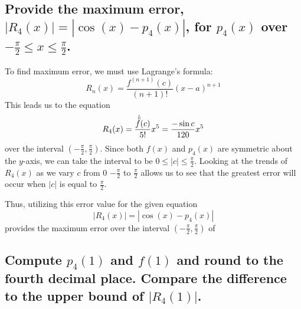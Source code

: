 \documentclass[12pt, letterpaper]{article}
\begin{document}
\subsection{Provide the maximum error, $|R_{4}{(x)}|=|\cos{(x)}-p_{4}{(x)}|$,
for $p_{4}{(x)}$ over $-\frac{\pi}{2}\leq x \leq \frac{\pi}{2}$.}
To find maximum error, we must use Lagrange's formula:
\begin{equation}
	R_{n}{(x)} = \frac{f^{(n+1)}{(c)}}{(n+1)!}{(x-a)}^{n+1}
\end{equation}
This leads us to the equation
\begin{equation}
	R_{4}{(x)}=\frac{\Dot{\Ddot{\Ddot{f}}}{(c)}}{5!}{x^{5}}=\frac{-\sin{c}}{120}x^{5}
\end{equation}
over the interval ${(-\frac{\pi}{2}, \frac{\pi}{2})}$.
Since both $f{(x)}$ and $p_4{(x)}$ are symmetric about the $y$-axis, we can
take the interval to be $0 \leq |c| \leq \frac{\pi}{2}$.
Looking at the trends of $R_4{(x)}$ as we vary $c$ from 0 $-\frac{\pi}{2}$ to
$\frac{\pi}{2}$ allows us to see that the greatest error will occur
when $|c|$ is equal to $\frac{\pi}{2}$. 

Thus, utilizing this error value for the given equation 
\begin{equation}
	|R_4{(x)}| = |\cos{(x)}-p_4{(x)}|
\end{equation}
provides the maximum error over the interval ${(-\frac{\pi}{2}, \frac{\pi}{2})}$
of  


\hfill\blacksquare%
\subsection{Compute $p_{4}{(1)}$ and $f{(1)}$ and round to the fourth decimal
place. Compare the difference to the upper bound of $|R_{4}{(1)}|$.}







\hfill\blacksquare%
\end{document}

